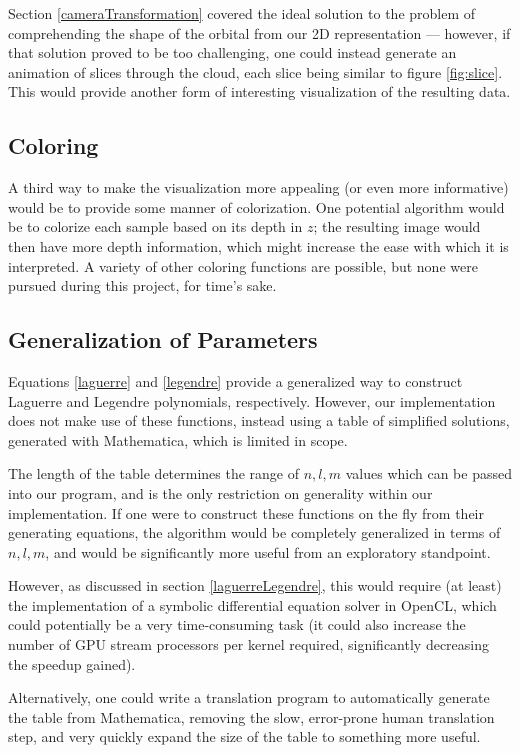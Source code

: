 \documentclass{acmsiggraph}
\begin{document}
Section \ref{cameraTransformation} covered the ideal solution to the problem of comprehending the shape of the orbital from our 2D representation --- however, if that solution proved to be too challenging, one could instead generate an animation of slices through the cloud, each slice being similar to figure \ref{fig:slice}. This would provide another form of interesting visualization of the resulting data.

\subsection{Coloring}

A third way to make the visualization more appealing (or even more informative) would be to provide some manner of colorization. One potential algorithm would be to colorize each sample based on its depth in $z$; the resulting image would then have more depth information, which might increase the ease with which it is interpreted. A variety of other coloring functions are possible, but none were pursued during this project, for time's sake.

\subsection{Generalization of Parameters}

Equations \ref{laguerre} and \ref{legendre} provide a generalized way to construct Laguerre and Legendre polynomials, respectively. However, our implementation does not make use of these functions, instead using a table of simplified solutions, generated with Mathematica, which is limited in scope.

The length of the table determines the range of $n, l, m$ values which can be passed into our program, and is the only restriction on generality within our implementation. If one were to construct these functions on the fly from their generating equations, the algorithm would be completely generalized in terms of $n, l, m$, and would be significantly more useful from an exploratory standpoint.

However, as discussed in section \ref{laguerreLegendre}, this would require (at least) the implementation of a symbolic differential equation solver in OpenCL, which could potentially be a very time-consuming task (it could also increase the number of GPU stream processors per kernel required, significantly decreasing the speedup gained).

Alternatively, one could write a translation program to automatically generate the table from Mathematica, removing the slow, error-prone human translation step, and very quickly expand the size of the table to something more useful.
\end{document}
